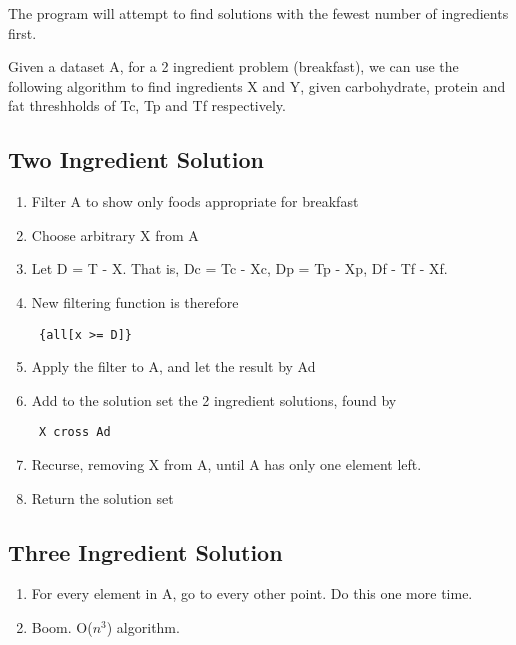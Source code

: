 \documentclass[a4paper]{article}
\begin{document}
The program will attempt to find solutions with the fewest number of 
ingredients first.

Given a dataset A, for a 2 ingredient problem (breakfast), we can use 
the following algorithm to find ingredients X and Y, given carbohydrate, 
protein and fat threshholds of Tc, Tp and Tf respectively.

\subsection{Two Ingredient Solution}

\begin{enumerate}
  \item Filter A to show only foods appropriate for breakfast

  \item Choose arbitrary X from A

  \item Let D = T - X. That is, Dc = Tc - Xc, Dp = Tp - Xp, Df - Tf - Xf.

  \item New filtering function is therefore \begin{verbatim} {all[x >= D]} \end{verbatim}

  \item Apply the filter to A, and let the result by Ad

  \item Add to the solution set the 2 ingredient solutions, found by \begin{verbatim} X cross Ad \end{verbatim}

  \item Recurse, removing X from A, until A has only one element left.

  \item Return the solution set
\end{enumerate}

\subsection{Three Ingredient Solution}

\begin{enumerate}
  \item For every element in A, go to every other point. Do this one more time.
  \item Boom. O($n^{3}$) algorithm.
\end{enumerate}
\end{document}
